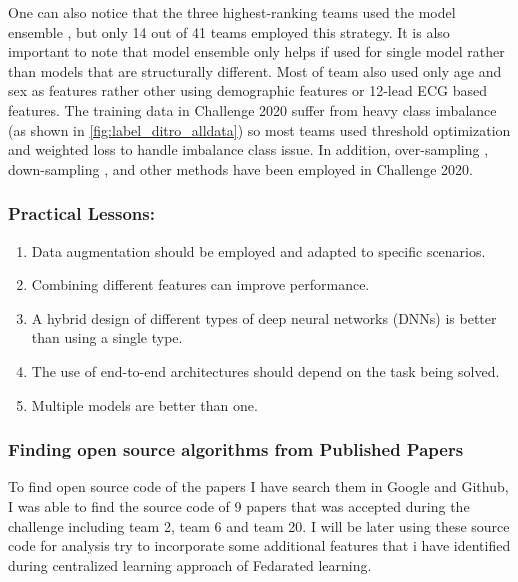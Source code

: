 \cite{main_arythmia_detection} One can also notice that the three highest-ranking teams used the model ensemble \cite{first_team, second_team, third_team}, but only 14 out of 41 teams employed this strategy. It is also important to note that model ensemble only helps if used for single model rather than models that are structurally different. Most of team also used only age and sex as features rather other using demographic features or 12-lead ECG based features. The training data in Challenge 2020 suffer from heavy class imbalance (as shown in \ref{fig:label_ditro_alldata}) so most teams used  threshold optimization \cite{eighth_team, second_team, ninth_team} and weighted loss \cite{sixth_team, seventh_team} to handle imbalance class issue. In addition, over-sampling \cite{thirteen_team}, down-sampling \cite{sixteen_team}, and other methods have been employed in Challenge 2020.

\subsubsection{Practical Lessons:}

\begin{enumerate}
  \item Data augmentation should be employed and adapted to specific scenarios.
  \item Combining different features can improve performance.
  \item A hybrid design of different types of deep neural networks (DNNs) is better than using a single type.
   \item The use of end-to-end architectures should depend on the task being solved.
   \item Multiple models are better than one.
\end{enumerate}

\subsubsection{Finding open source algorithms from Published Papers}

To find open source code of the papers I have search them in Google and Github, I was able to find the source code of 9 papers that was accepted during the challenge including team 2, team 6 and team 20. I will be later using these source code for analysis try to incorporate some additional features that i have identified during centralized learning approach of Fedarated learning. 

